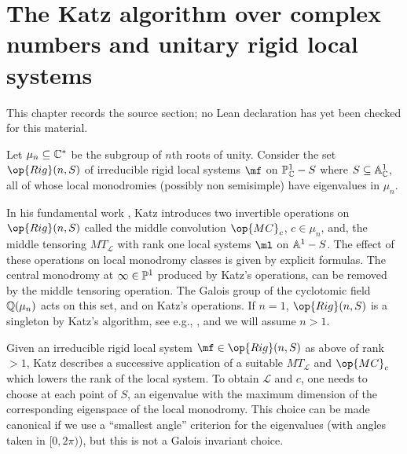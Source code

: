 \chapter{The Katz algorithm over complex numbers and unitary rigid local systems}
\label{rigid-local-systems-multiplicative-eigenvalue-problem-chapter-15}

\begin{remark}
\label{rigid-local-systems-multiplicative-eigenvalue-problem-chapter-15-source}
This chapter records the source section; no Lean declaration has yet been checked for this material.
\notready
\end{remark}

\label{earlyfeedback}
Let $\mu_n\subseteq\Bbb{C}^*$ be the subgroup of $n$th roots of unity. Consider the set $\op{Rig}(n,S)$ of irreducible rigid local systems $\mf$ on $\Bbb{P}^1_{\Bbb{C}}-S$ where $S\subseteq \Bbb{A}_{\Bbb{C}}^1$, all of whose local monodromies (possibly non semisimple) have eigenvalues in $\mu_n$.

In his fundamental work \cite{Katz}, Katz introduces two invertible operations on $\op{Rig}(n,S)$ called the middle convolution $\op{MC}_{c}$, $c\in \mu_n$, and, the middle  tensoring $MT_{\mathcal{L}}$ with rank one local systems $\ml$ on $\Bbb{A}^1-S$.  The effect of these operations on local monodromy classes  is given by explicit formulas. The central monodromy at $\infty\in \Bbb{P}^1$ produced by Katz's operations,  can be removed by the middle tensoring operation. The Galois group of the cyclotomic field $\Bbb{Q}(\mu_n)$ acts on this set, and on Katz's operations. If $n=1$,   $\op{Rig}(n,S)$  is a singleton by Katz's algorithm, see  e.g., \cite[Proof of Theorem 9.15]{MM}, and we will assume $n>1$.


Given an irreducible rigid local system $\mf\in \op{Rig}(n,S)$ as above of rank $>1$, Katz \cite{Katz} describes a successive application of a suitable $MT_{\mathcal{L}}$ and $\op{MC}_{c}$ which lowers the rank of the  local system. To obtain $\mathcal{L}$ and $c$, one needs to choose at each point of $S$, an eigenvalue with  the maximum dimension of the corresponding eigenspace of the local monodromy. This choice can be made canonical if we use a ``smallest angle'' criterion for  the eigenvalues  (with angles taken in $[0,2\pi)$), but this is not a Galois invariant choice.

